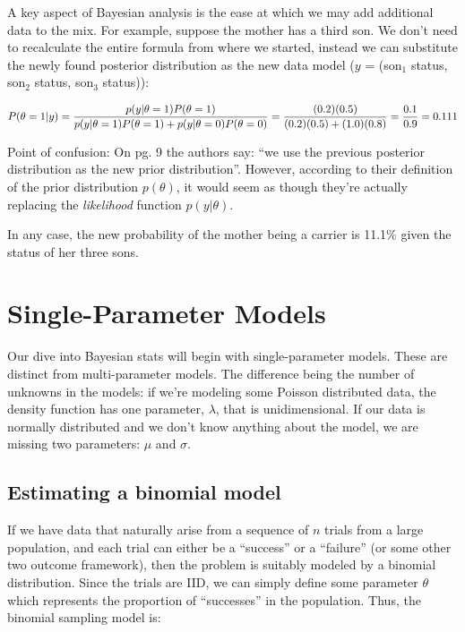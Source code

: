 \documentclass[]{book}
\begin{document}
A key aspect of Bayesian analysis is the ease at which we may add
additional data to the mix. For example, suppose the mother has a third
son. We don't need to recalculate the entire formula from where we
started, instead we can substitute the newly found posterior
distribution as the new data model (\(y\) = (son\(_1\) status, son\(_2\)
status, son\(_3\) status)):

\[
P(\theta = 1|y) = \frac{p(y|\theta = 1)P(\theta = 1)}{p(y|\theta = 1)P(\theta = 1) + p(y|\theta = 0)P(\theta = 0)}\\
= \frac{(0.2)(0.5)}{(0.2)(0.5) + (1.0)(0.8)} = \frac{0.1}{0.9} = 0.111
\]

Point of confusion: On pg. 9 the authors say: ``we use the previous
posterior distribution as the new prior distribution''. However,
according to their definition of the prior distribution \(p(\theta)\),
it would seem as though they're actually replacing the \emph{likelihood}
function \(p(y|\theta)\).

In any case, the new probability of the mother being a carrier is 11.1\%
given the status of her three sons.

\chapter{Single-Parameter Models}\label{single}

Our dive into Bayesian stats will begin with single-parameter models.
These are distinct from multi-parameter models. The difference being the
number of unknowns in the models: if we're modeling some Poisson
distributed data, the density function has one parameter, \(\lambda\),
that is unidimensional. If our data is normally distributed and we don't
know anything about the model, we are missing two parameters: \(\mu\)
and \(\sigma\).

\section{Estimating a binomial model}\label{estimating-a-binomial-model}

If we have data that naturally arise from a sequence of \(n\) trials
from a large population, and each trial can either be a ``success'' or a
``failure'' (or some other two outcome framework), then the problem is
suitably modeled by a binomial distribution. Since the trials are IID,
we can simply define some parameter \(\theta\) which represents the
proportion of ``successes'' in the population. Thus, the binomial
sampling model is:
\end{document}
